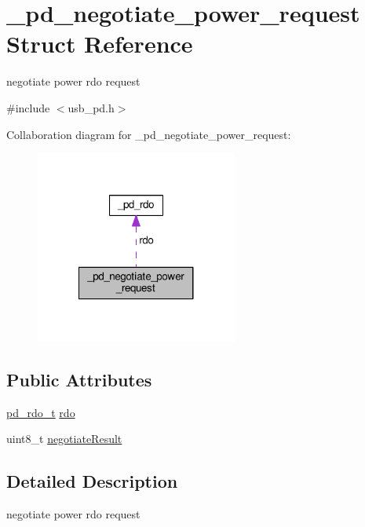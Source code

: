 \hypertarget{struct__pd__negotiate__power__request}{\section{\-\_\-pd\-\_\-negotiate\-\_\-power\-\_\-request Struct Reference}
\label{struct__pd__negotiate__power__request}
}


negotiate power rdo request  




{\ttfamily \#include $<$usb\-\_\-pd.\-h$>$}



Collaboration diagram for \-\_\-pd\-\_\-negotiate\-\_\-power\-\_\-request\-:
\nopagebreak
\begin{figure}[H]
\begin{center}
\leavevmode
\includegraphics[width=188pt]{struct__pd__negotiate__power__request__coll__graph}
\end{center}
\end{figure}
\subsection*{Public Attributes}
\begin{DoxyCompactItemize}
\item 
\hyperlink{group__usb__pd__stack_ga4dcb1103574222cf94d4b45128f2b884}{pd\-\_\-rdo\-\_\-t} \hyperlink{struct__pd__negotiate__power__request_a6a2c0c69d7a8506ef0334d0718a28191}{rdo}
\item 
uint8\-\_\-t \hyperlink{struct__pd__negotiate__power__request_ac2aedb2edf9cb0038c459dface0494bf}{negotiate\-Result}
\end{DoxyCompactItemize}


\subsection{Detailed Description}
negotiate power rdo request 

